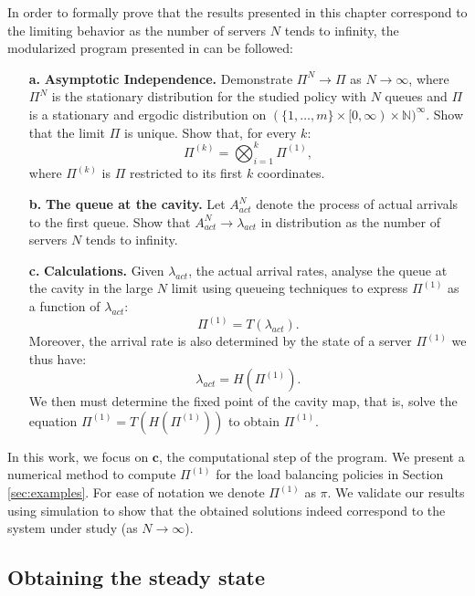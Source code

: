 \documentclass[12pt]{report}
\begin{document}
In order to formally prove that the results presented in this chapter correspond to
the limiting behavior as the number of servers $N$ tends to infinity, the modularized program
presented in \cite{bramsonLB} can be followed:
\begin{itemize}
\item[\textbf{a.}] \textbf{Asymptotic Independence.} Demonstrate $\Pi^N \rightarrow \Pi$ as $N \rightarrow \infty$, where $\Pi^N$ is the stationary distribution for the studied policy with $N$ queues and $\Pi$ is a stationary and ergodic distribution on $(\{1,\ldots,m\}\times[0,\infty)\times \mathbb{N})^\infty$. Show that the limit $\Pi$ is unique. Show that, for every $k$:
$$
\Pi^{(k)} = \bigotimes_{i=1}^k \Pi^{(1)},
$$
where $\Pi^{(k)}$ is $\Pi$ restricted to its first $k$ coordinates.
\item[\textbf{b.}] \textbf{The queue at the cavity.} Let $A_{act}^N$ denote the process of actual arrivals to the first queue. Show that $A_{act}^N \rightarrow \lambda_{act}$ in distribution as the number of servers $N$ tends to infinity. 
\item[\textbf{c.}] \textbf{Calculations.} Given $\lambda_{act}$, the actual arrival rates, analyse the queue at the cavity in the large $N$ limit using queueing techniques to express $\Pi^{(1)}$ as a function of $\lambda_{act}$:
$$
\Pi^{(1)}=T(\lambda_{act}).
$$
Moreover, the arrival rate is also determined by the state of a server $\Pi^{(1)}$ we thus have:
$$
\lambda_{act}= H(\Pi^{(1)}).
$$
We then must determine the fixed point of the cavity map, that is, solve
the equation $\Pi^{(1)}=T(H(\Pi^{(1)}))$  to obtain $\Pi^{(1)}$.
\end{itemize}
In this work, we focus on $\textbf{c}$, the computational step of the program. We present a numerical method to compute $\Pi^{(1)}$ for the load balancing policies in Section \ref{sec:examples}. For ease of notation we denote $\Pi^{(1)}$ as $\pi$.
We validate our results using simulation to show that the obtained solutions indeed correspond to the system under study (as $N\rightarrow \infty$).

\subsection{Obtaining the steady state} \label{sec:obtain_stationary}
\end{document}
